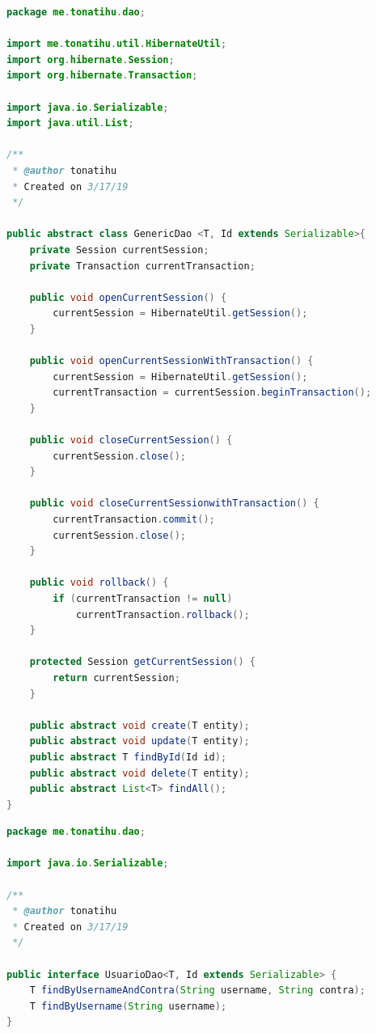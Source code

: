 \documentclass[a4paper,12pt]{article}
\begin{document}
\begin{lstlisting}[language=Java, style=customJava, 
caption={GenericDao.java}, captionpos=b,basicstyle=\fontfamily{cmss}\small]
package me.tonatihu.dao;

import me.tonatihu.util.HibernateUtil;
import org.hibernate.Session;
import org.hibernate.Transaction;

import java.io.Serializable;
import java.util.List;

/**
 * @author tonatihu
 * Created on 3/17/19
 */

public abstract class GenericDao <T, Id extends Serializable>{
    private Session currentSession;
    private Transaction currentTransaction;

    public void openCurrentSession() {
        currentSession = HibernateUtil.getSession();
    }

    public void openCurrentSessionWithTransaction() {
        currentSession = HibernateUtil.getSession();
        currentTransaction = currentSession.beginTransaction();
    }

    public void closeCurrentSession() {
        currentSession.close();
    }

    public void closeCurrentSessionwithTransaction() {
        currentTransaction.commit();
        currentSession.close();
    }

    public void rollback() {
        if (currentTransaction != null)
            currentTransaction.rollback();
    }

    protected Session getCurrentSession() {
        return currentSession;
    }

    public abstract void create(T entity);
    public abstract void update(T entity);
    public abstract T findById(Id id);
    public abstract void delete(T entity);
    public abstract List<T> findAll();
}
\end{lstlisting}

\begin{lstlisting}[language=Java, style=customJava, 
caption={UsuarioDao.java}, captionpos=b,basicstyle=\fontfamily{cmss}\small]
package me.tonatihu.dao;

import java.io.Serializable;

/**
 * @author tonatihu
 * Created on 3/17/19
 */

public interface UsuarioDao<T, Id extends Serializable> {
    T findByUsernameAndContra(String username, String contra);
    T findByUsername(String username);
}
\end{lstlisting}
\end{document}
